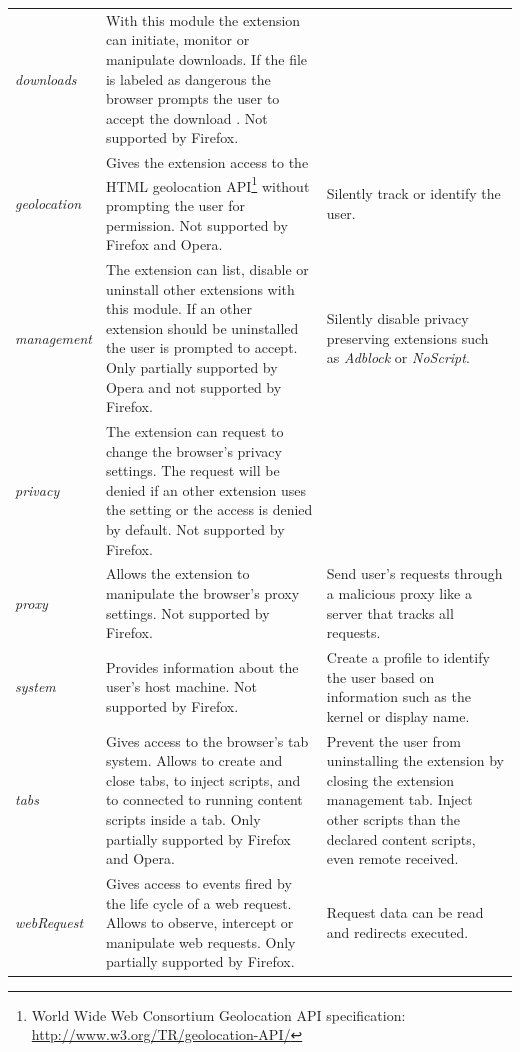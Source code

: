 \documentclass[article,colorback,accentcolor=tud9c,type=bsc]{tudthesis}
\begin{document}
\begin{tabular}{lp{}p{}}
		\textit{downloads} & With this module the extension can initiate, monitor or manipulate downloads. If the file is labeled as dangerous the browser prompts the user to accept the download \cite{chromeMaliciousDownloads}. Not supported by Firefox. &  \\
		
		\textit{geolocation} & Gives the extension access to the HTML geolocation API\footnote{World Wide Web Consortium Geolocation API specification: \url{http://www.w3.org/TR/geolocation-API/}} without prompting the user for permission. Not supported by Firefox and Opera. & Silently track or identify the user. \\
		
		\textit{management} & The extension can list, disable or uninstall other extensions with this module. If an other extension should be uninstalled the user is prompted to accept. Only partially supported by Opera and not supported by Firefox. & Silently disable privacy preserving extensions such as \textit{Adblock} or \textit{NoScript}. \\
		
		\textit{privacy} & The extension can request to change the browser's privacy settings. The request will be denied if an other extension uses the setting or the access is denied by default. Not supported by Firefox. & \\
		
		\textit{proxy} & Allows the extension to manipulate the browser's proxy settings. Not supported by Firefox. & Send user's requests through a malicious proxy like a server that tracks all requests. \\
		
		\textit{system} & Provides information about the user's host machine. Not supported by Firefox. & Create a profile to identify the user based on information such as the kernel or display name. \\
		
		\textit{tabs} & Gives access to the browser's tab system. Allows to create and close tabs, to inject scripts, and to connected to running content scripts inside a tab. Only partially supported by Firefox and Opera. & Prevent the user from uninstalling the extension by closing the extension management tab. Inject other scripts than the declared content scripts, even remote received. \\
		
		\textit{webRequest} & Gives access to events fired by the life cycle of a web request. Allows to observe, intercept or manipulate web requests. Only partially supported by Firefox. & Request data can be read and redirects executed. \\  	 	
		
	\end{tabular}
	\renewcommand{\arraystretch}{1}
	
\end{document}
